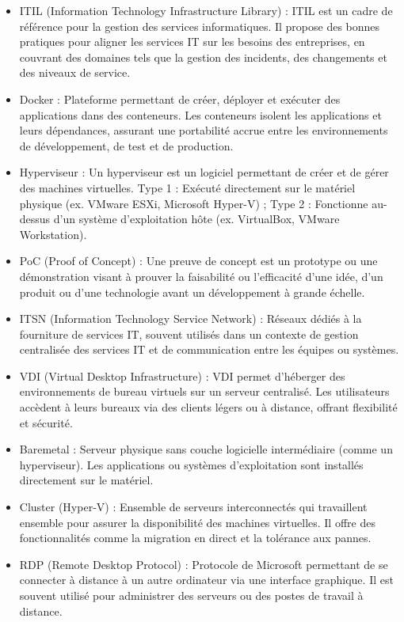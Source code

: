 \documentclass{article}
\begin{document}
\begin{itemize}
  \item ITIL (Information Technology Infrastructure Library) : ITIL est un cadre de référence pour la gestion des services informatiques. Il propose des bonnes pratiques pour aligner les services IT sur les besoins des entreprises, en couvrant des domaines tels que la gestion des incidents, des changements et des niveaux de service.
  \item Docker : Plateforme permettant de créer, déployer et exécuter des applications dans des conteneurs. Les conteneurs isolent les applications et leurs dépendances, assurant une portabilité accrue entre les environnements de développement, de test et de production.
  \item Hyperviseur : Un hyperviseur est un logiciel permettant de créer et de gérer des machines virtuelles. Type 1 : Exécuté directement sur le matériel physique (ex. VMware ESXi, Microsoft Hyper-V) ; Type 2 : Fonctionne au-dessus d’un système d’exploitation hôte (ex. VirtualBox, VMware Workstation).
  \item PoC (Proof of Concept) : Une preuve de concept est un prototype ou une démonstration visant à prouver la faisabilité ou l’efficacité d’une idée, d’un produit ou d’une technologie avant un développement à grande échelle.
  \item ITSN (Information Technology Service Network) : Réseaux dédiés à la fourniture de services IT, souvent utilisés dans un contexte de gestion centralisée des services IT et de communication entre les équipes ou systèmes.
  \item VDI (Virtual Desktop Infrastructure) : VDI permet d’héberger des environnements de bureau virtuels sur un serveur centralisé. Les utilisateurs accèdent à leurs bureaux via des clients légers ou à distance, offrant flexibilité et sécurité.
  \item Baremetal : Serveur physique sans couche logicielle intermédiaire (comme un hyperviseur). Les applications ou systèmes d’exploitation sont installés directement sur le matériel.
  \item Cluster (Hyper-V) : Ensemble de serveurs interconnectés qui travaillent ensemble pour assurer la disponibilité des machines virtuelles. Il offre des fonctionnalités comme la migration en direct et la tolérance aux pannes.
  \item RDP (Remote Desktop Protocol) : Protocole de Microsoft permettant de se connecter à distance à un autre ordinateur via une interface graphique. Il est souvent utilisé pour administrer des serveurs ou des postes de travail à distance.

\end{itemize}
\end{document}
